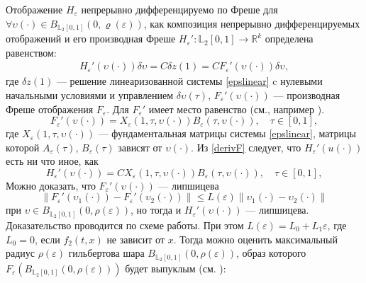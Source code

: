 \documentclass[../main.tex]{subfiles}
\begin{document}
	Отображение $ H_{\varepsilon} $ непрерывно дифференцируемо по Фреше для $ \forall \upsilon(\cdot) \in  B_{\mathbb{L}_2[0,1]}(0,\varrho(\varepsilon)) $, как композиция непрерывно дифференцируемых отображений и его производная Фреше $ H_{\varepsilon}': \mathbb{L}_2[0,1]  \rightarrow  \mathbb{R}^k $ определена равенством:
	\begin{gather*}
		H_{\varepsilon}'( \upsilon(\cdot))\delta \upsilon = C \delta z(1) = C F_{\varepsilon}'(\upsilon(\cdot))\delta  \upsilon,
	\end{gather*}
	где $ \delta z(1) $ --- решение линеаризованной системы \eqref{epslinear} c нулевыми начальными условиями и управлением $  \delta  \upsilon(\tau) $, $ F_{\varepsilon}'( \upsilon(\cdot)) $ --- производная Фреше отображения $ F _{\varepsilon}$.
	Для $ F_{\varepsilon}' $ имеет место равенство (см., например \cite{GusevMotor}).
	\begin{equation}\label{derivF}
		F_{\varepsilon}'( \upsilon(\cdot)) = X_{\varepsilon}(1,\tau, \upsilon(\cdot))B_{\varepsilon} (\tau, \upsilon(\cdot)), \quad \tau\in[0,1],
	\end{equation}
	где $ X_{\varepsilon}(1,\tau,\upsilon(\cdot)) $ --- фундаментальная матрицы системы \eqref{epslinear}, матрицы которой $ A_{\varepsilon}(\tau) $, $ B_{\varepsilon}(\tau)  $ зависят от $ \upsilon(\cdot) $.
	Из \eqref{derivF} следует, что $ H_{\varepsilon}'(u(\cdot)) $ есть ни что иное, как
	\begin{equation*}
		H_{\varepsilon}'(\upsilon(\cdot)) = C X_{\varepsilon}(1,\tau, \upsilon(\cdot))B_{\varepsilon} (\tau, \upsilon(\cdot)), \quad \tau\in[0,1],
	\end{equation*}
	Можно доказать, что $ F_{\varepsilon}'(\upsilon(\cdot)) $ --- липшицева
	\begin{equation}\label{lipdF}
		\left\| F_{\varepsilon}'(\upsilon_1(\cdot)) - F_{\varepsilon}'(\upsilon_2(\cdot)) \right\| \leqslant L(\varepsilon) \left\| \upsilon_1(\cdot) - \upsilon_2(\cdot)\right\|
	\end{equation}
	при $ \upsilon \in B_{\mathbb{L}_2[0,1]}(0,\rho(\varepsilon))  $, но тогда и $ H_{\varepsilon}'(\upsilon(\cdot)) $ --- липшицева. Доказательство проводится по схеме работы\cite{GusevUMJ}.  При этом $ L(\varepsilon) = L_0 + L_1 \varepsilon $, где $ L_0 = 0$, если $ f_2(t,x)  $ не зависит от $ x $.
	Тогда можно оценить максимальный радиус $ \rho(\varepsilon) $ гильбертова шара $ B_{\mathbb{L}_2[0,1]}(0,\rho(\varepsilon)) $, образ которого $ F_{\varepsilon}(B_{\mathbb{L}_2[0,1]}(0,\rho(\varepsilon))) $ будет выпуклым (см. \cite{Polyak2004}):
\end{document}

